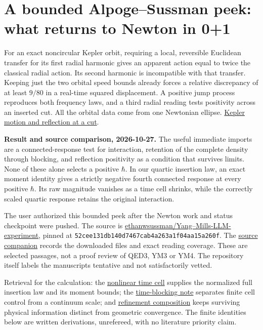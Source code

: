 \documentclass[11pt,a4paper]{article}
\begin{document}
\section{A bounded Alpoge--Sussman peek: what returns to Newton in
0+1}\label{a-bounded-alpogesussman-peek-what-returns-to-newton-in-01}

For an exact noncircular Kepler orbit, requiring a local, reversible
Euclidean transfer for its first radial harmonic gives an apparent
action equal to twice the classical radial action. Its second harmonic
is incompatible with that transfer. Keeping just the two orbital speed
bounds already forces a relative discrepancy of at least \(9/80\) in a
real-time squared displacement. A positive jump process reproduces both
frequency laws, and a third radial reading tests positivity across an
inserted cut. All the orbital data come from one Newtonian ellipse.
\hyperref[kepler-motion-and-reflection-at-a-cut]{Kepler motion and
reflection at a cut}.

\textbf{Result and source comparison, 2026-10-27.} The useful immediate
imports are a connected-response test for interaction, retention of the
complete density through blocking, and reflection positivity as a
condition that survives limits. None of these alone selects a positive
\(\hbar\). In our quartic insertion law, an exact moment identity gives
a strictly negative fourth connected response at every positive
\(\hbar\). Its raw magnitude vanishes as a time cell shrinks, while the
correctly scaled quartic response retains the original interaction.

The user authorized this bounded peek after the Newton work and status
checkpoint were pushed. The source is
\href{https://github.com/ethanwsussman/Yang--Mills-LLM-experiment}{ethanwsussman/Yang--Mills-LLM-experiment},
pinned at \texttt{52cee131db140d7467cab4a263a1f04aa15a260f}. The
\href{../docs/AlpogeSussman_YangMills_2026.md}{source companion} records
the downloaded files and exact reading coverage. These are selected
passages, not a proof review of QED3, YM3 or YM4. The repository itself
labels the manuscripts tentative and not satisfactorily vetted.

Retrieval for the calculation: the
\href{newton-nonlinear-time-cell.md}{nonlinear time cell} supplies the
normalized full insertion law and its moment bounds; the
\href{balaban-newton-time-blocking.md}{time-blocking note} separates
finite cell control from a continuum scale; and
\href{refinement-composition-and-limit.md}{refinement composition} keeps
surviving physical information distinct from geometric convergence. The
finite identities below are written derivations, unrefereed, with no
literature priority claim.
\end{document}
